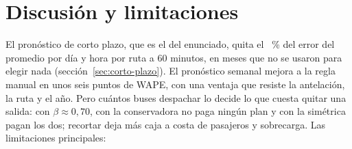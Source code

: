 \section{Discusión y limitaciones}
\label{sec:discusion}

El pronóstico de corto plazo, que es el del enunciado, quita el \CPRutaQuitaLX~\% del error del promedio por día y
hora por ruta a 60 minutos, en meses que no se usaron para elegir nada (sección~\ref{sec:corto-plazo}). El
pronóstico semanal mejora a la regla manual en unos seis puntos de WAPE, con una ventaja que resiste la antelación, la
ruta y el año. Pero cuántos buses despachar lo decide lo que cuesta quitar una salida: con $\beta \approx 0{,}70$,
con la conservadora no paga ningún plan y con la simétrica pagan los dos; recortar deja más caja a costa de pasajeros y
sobrecarga. Las limitaciones principales:
